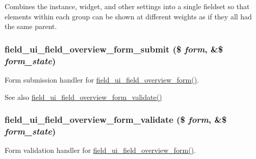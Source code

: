 Combines the instance, widget, and other settings into a single fieldset so that elements within each group can be shown at different weights as if they all had the same parent. \hypertarget{field__ui_8admin_8inc_ae8451ea140d864dd6c91fd9ac6703764}{
\subsubsection[{field\_\-ui\_\-field\_\-overview\_\-form\_\-submit}]{\setlength{\rightskip}{0pt plus 5cm}field\_\-ui\_\-field\_\-overview\_\-form\_\-submit (\$ {\em form}, \/  \&\$ {\em form\_\-state})}}
\label{field__ui_8admin_8inc_ae8451ea140d864dd6c91fd9ac6703764}
Form submission handler for \hyperlink{group__forms_gad62638f853fe251696eb3b57e8111845}{field\_\-ui\_\-field\_\-overview\_\-form()}.

\begin{DoxySeeAlso}{See also}
\hyperlink{field__ui_8admin_8inc_a1e5fb5a6f69ee3f155c3b433ad78ba1e}{field\_\-ui\_\-field\_\-overview\_\-form\_\-validate()} 
\end{DoxySeeAlso}
\hypertarget{field__ui_8admin_8inc_a1e5fb5a6f69ee3f155c3b433ad78ba1e}{
\subsubsection[{field\_\-ui\_\-field\_\-overview\_\-form\_\-validate}]{\setlength{\rightskip}{0pt plus 5cm}field\_\-ui\_\-field\_\-overview\_\-form\_\-validate (\$ {\em form}, \/  \&\$ {\em form\_\-state})}}
\label{field__ui_8admin_8inc_a1e5fb5a6f69ee3f155c3b433ad78ba1e}
Form validation handler for \hyperlink{group__forms_gad62638f853fe251696eb3b57e8111845}{field\_\-ui\_\-field\_\-overview\_\-form()}.

